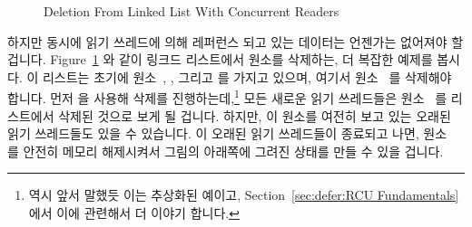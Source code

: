 \begin{figure}[tb]
\begin{center}
\end{center}
\caption{Deletion From Linked List With Concurrent Readers}
\label{fig:defer:Deletion From Linked List With Concurrent Readers}
\end{figure}

하지만 동시에 읽기 쓰레드에 의해 레퍼런스 되고 있는 데이터는 언젠가는 없어져야
할 겁니다.
Figure~\ref{fig:defer:Deletion From Linked List With Concurrent Readers} 와
같이 링크드 리스트에서 원소를 삭제하는, 더 복잡한 예제를 봅시다.
이 리스트는 초기에 원소~, , 그리고  를 가지고 있으며, 여기서
원소~ 를 삭제해야 합니다.
먼저  을 사용해 삭제를 진행하는데,\footnote{
	역시 앞서 말했듯 이는 추상화된 예이고,
	Section~\ref{sec:defer:RCU Fundamentals} 에서 이에 관련해서 더 이야기
합니다.}
모든 새로운 읽기 쓰레드들은 원소~ 를 리스트에서 삭제된
것으로 보게 될 겁니다.
하지만, 이 원소를 여전히 보고 있는 오래된 읽기 쓰레드들도 있을 수
있습니다.
이 오래된 읽기 쓰레드들이 종료되고 나면, 원소~ 를 안전히 메모리
해제시켜서 그림의 아래쪽에 그려진 상태를 만들 수 있을 겁니다.
\iffalse

